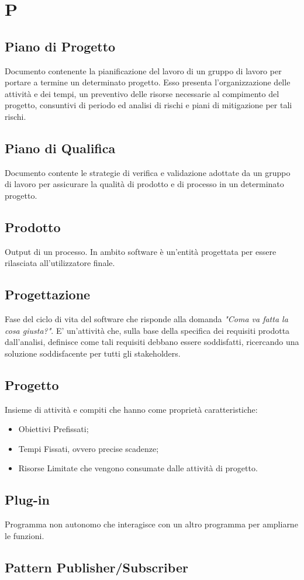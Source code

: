 \section*{P}

\subsection{Piano di Progetto}
Documento contenente la pianificazione del lavoro di un gruppo di lavoro per portare a termine un determinato progetto. Esso presenta l'organizzazione delle attività e dei tempi, un preventivo delle risorse necessarie al compimento del progetto, consuntivi di periodo ed analisi di rischi e piani di mitigazione per tali rischi.

\subsection{Piano di Qualifica}
Documento contente le strategie di verifica e validazione adottate da un gruppo di lavoro per assicurare la qualità di prodotto e di processo in un determinato progetto.

\subsection{Prodotto}
Output di un processo. In ambito software è un'entità progettata per essere rilasciata all'utilizzatore finale.

\subsection{Progettazione}
Fase del ciclo di vita del software che risponde alla domanda \textit{"Coma va fatta la cosa giusta?"}. E' un'attività che, sulla base della specifica dei requisiti prodotta dall'analisi, definisce come tali requisiti debbano essere soddisfatti, ricercando una soluzione soddisfacente per tutti gli stakeholders.

\subsection{Progetto}
Insieme di attività e compiti che hanno come proprietà caratteristiche:
\begin{itemize}
	\item Obiettivi Prefissati;
	\item Tempi Fissati, ovvero precise scadenze;
	\item Risorse Limitate che vengono consumate dalle attività di progetto.
\end{itemize}

\subsection{Plug-in} 
Programma non autonomo che interagisce con un altro programma per ampliarne le funzioni.

\subsection{Pattern Publisher/Subscriber} 